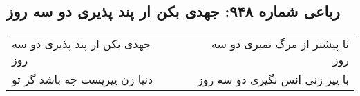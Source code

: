 \begin{center}
\section*{رباعی شماره ۹۴۸: جهدی بکن ار پند پذیری دو سه روز}
\label{sec:0948}
\begin{longtable}{l p{0.5cm} r}
جهدی بکن ار پند پذیری دو سه روز
&&
تا پیشتر از مرگ نمیری دو سه روز
\\
دنیا زن پیریست چه باشد گر تو
&&
با پیر زنی انس نگیری دو سه روز
\\
\end{longtable}
\end{center}
